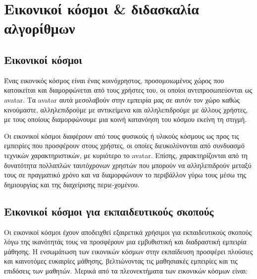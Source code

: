 \hideheader
\section{Εικονικοί κόσμοι \& διδασκαλία αλγορίθμων}

\subsection{Εικονικοί κόσμοι}

Ένας εικονικός κόσμος είναι ένας κοινόχρηστος, προσομοιωμένος χώρος που κατοικείται και διαμορφώνεται από τους χρήστες του, οι οποίοι αντιπροσωπεύονται ως \gls{avatar}. Τα \gls{avatar} αυτά μεσολαβούν στην εμπειρία μας σε αυτόν τον χώρο καθώς κινούμαστε, αλληλεπιδρούμε με αντικείμενα και αλληλεπιδρούμε με άλλους χρήστες, με τους οποίους διαμορφώνουμε μια κοινή κατανόηση του κόσμου εκείνη τη στιγμή.

Οι εικονικοί κόσμοι διαφέρουν από τους φυσικούς ή υλικούς κόσμους ως προς τις εμπειρίες που προσφέρουν στους χρήστες, οι οποίες διευκολύνονται από συνδυασμό τεχνικών χαρακτηριστικών, με κυριότερο το \gls{avatar}. Επίσης, χαρακτηρίζονται από τη δυνατότητα πολλαπλών ταυτόχρονων χρηστών που μπορούν να αλληλεπιδρούν μεταξύ τους σε πραγματικό χρόνο και να διαμορφώνουν το περιβάλλον γύρω τους μέσω της δημιουργίας και της διαχείρισης περιε-χομένου\cite{girvan_what_2018}.


\subsection{Εικονικοί κόσμοι για εκπαιδευτικούς σκοπούς}

Οι εικονικοί κόσμοι έχουν αποδειχθεί εξαιρετικά χρήσιμοι για εκπαιδευτικούς σκοπούς λόγω της ικανότητάς τους να προσφέρουν μια εμβυθιστική και διαδραστική εμπειρία μάθησης. Η ενσωμάτωση των εικονικών κόσμων στην εκπαίδευση προσφέρει πλούσιες και καινοτόμες ευκαιρίες μάθησης, βελτιώνοντας τις μαθησιακές εμπειρίες και τις επιδόσεις των μαθητών. Μερικά από τα πλεονεκτήματα των εικονικών κόσμων είναι:

